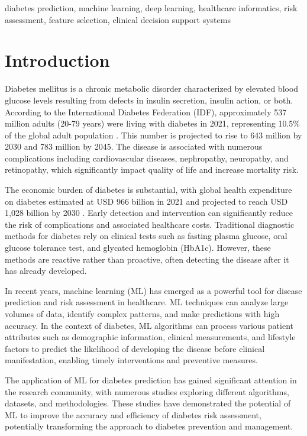 \documentclass[journal]{IEEEtran}
\begin{document}
\begin{IEEEkeywords}
diabetes prediction, machine learning, deep learning, healthcare informatics, risk assessment, feature selection, clinical decision support systems
\end{IEEEkeywords}

\section{Introduction}
Diabetes mellitus is a chronic metabolic disorder characterized by elevated blood glucose levels resulting from defects in insulin secretion, insulin action, or both. According to the International Diabetes Federation (IDF), approximately 537 million adults (20-79 years) were living with diabetes in 2021, representing 10.5\% of the global adult population \cite{idf2021}. This number is projected to rise to 643 million by 2030 and 783 million by 2045. The disease is associated with numerous complications including cardiovascular diseases, nephropathy, neuropathy, and retinopathy, which significantly impact quality of life and increase mortality risk.

The economic burden of diabetes is substantial, with global health expenditure on diabetes estimated at USD 966 billion in 2021 and projected to reach USD 1,028 billion by 2030 \cite{idf2021}. Early detection and intervention can significantly reduce the risk of complications and associated healthcare costs. Traditional diagnostic methods for diabetes rely on clinical tests such as fasting plasma glucose, oral glucose tolerance test, and glycated hemoglobin (HbA1c). However, these methods are reactive rather than proactive, often detecting the disease after it has already developed.

In recent years, machine learning (ML) has emerged as a powerful tool for disease prediction and risk assessment in healthcare. ML techniques can analyze large volumes of data, identify complex patterns, and make predictions with high accuracy. In the context of diabetes, ML algorithms can process various patient attributes such as demographic information, clinical measurements, and lifestyle factors to predict the likelihood of developing the disease before clinical manifestation, enabling timely interventions and preventive measures.

The application of ML for diabetes prediction has gained significant attention in the research community, with numerous studies exploring different algorithms, datasets, and methodologies. These studies have demonstrated the potential of ML to improve the accuracy and efficiency of diabetes risk assessment, potentially transforming the approach to diabetes prevention and management.
\end{document}
